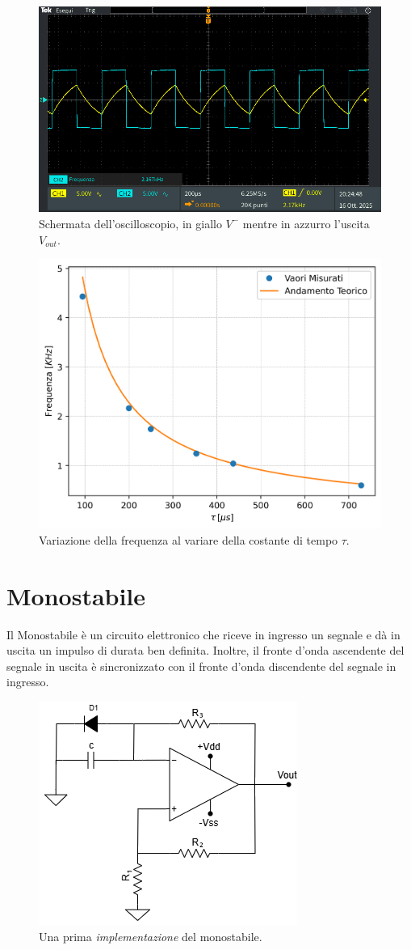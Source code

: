 \documentclass[a4paper,12pt]{article}
\begin{document}
\begin{figure}[h]
	\centering
	\includegraphics[width=0.7\linewidth]{immagini/oscillatore/oscillatore.PNG}
	\caption{Schermata dell'oscilloscopio, in giallo $V^-$ mentre in azzurro l'uscita $V_{out}$.}
	\label{fig:oscillatore}
\end{figure}

\begin{figure}[h]
	\centering
	\includegraphics[width=0.6\linewidth]{immagini/oscillatore/freq_tau.png}
	\caption{Variazione della frequenza al variare della costante di tempo $\tau$.}
	\label{fig:oscillatore_freq_tau}
\end{figure}
\FloatBarrier

\section*{Monostabile}
Il Monostabile è un circuito elettronico che riceve in ingresso un segnale e dà in uscita un impulso di durata ben definita.
Inoltre, il fronte d'onda ascendente del segnale in uscita è sincronizzato con il fronte d'onda discendente del segnale in ingresso.

\begin{figure}[h]
	\centering
	\includegraphics[width=0.5\linewidth]{immagini/monostabile/circuito_1.png}
	\caption{Una prima \textit{implementazione} del monostabile.}
	\label{fig:schematico_monostabile_1}
\end{figure}
\end{document}
